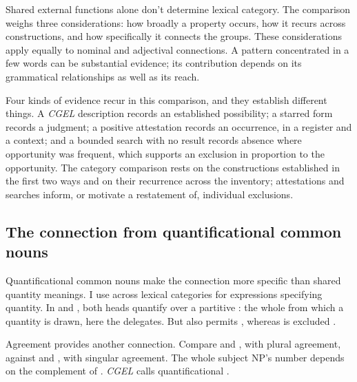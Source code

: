 \documentclass[12pt]{article}
\begin{document}
Shared external functions alone don't determine lexical category. The comparison weighs three considerations: how broadly a property occurs, how it recurs across constructions, and how specifically it connects the groups. These considerations apply equally to nominal and adjectival connections. A pattern concentrated in a few words can be substantial evidence; its contribution depends on its grammatical relationships as well as its reach.

Four kinds of evidence recur in this comparison, and they establish different things. A \textit{CGEL} description records an established possibility; a starred form records a judgment; a positive attestation records an occurrence, in a register and a context; and a bounded search with no result records absence where opportunity was frequent, which supports an exclusion in proportion to the opportunity. The category comparison rests on the constructions established in the first two ways and on their recurrence across the inventory; attestations and searches inform, or motivate a restatement of, individual exclusions.

\subsection{The connection from quantificational common nouns}\label{sec:quant-nouns}

Quantificational common nouns make the connection more specific than shared quantity meanings. I use  across lexical categories for expressions specifying quantity. In  and , both heads quantify over a partitive : the whole from which a quantity is drawn, here the delegates. But  also permits , whereas  is excluded \citep[349]{huddleston2002}.

Agreement provides another connection. Compare  and , with plural agreement, against  and , with singular agreement. The whole subject NP's number depends on the complement of . \textit{CGEL} calls quantificational   \citep[349--350, 411--412]{huddleston2002}.
\end{document}
